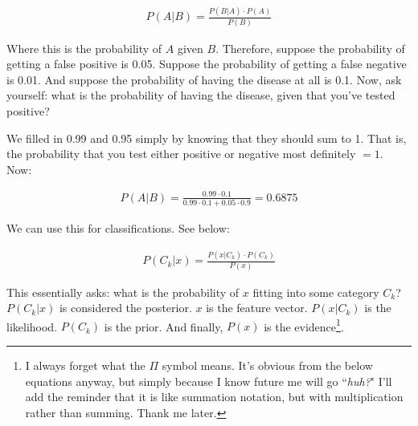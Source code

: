 \begin{equation}
\begin{split}
    P(A | B) = \frac{P(B | A) \cdot P(A)}{P(B)}
\end{split}
\end{equation}

Where this is the probability of $A$ given $B$. Therefore, suppose the probability of getting a false positive is 0.05. Suppose the probability of getting a false negative is 0.01. And suppose the probability of having the disease at all is 0.1. Now, ask yourself: what is the probability of having the disease, given that you've tested positive?\newline


We filled in 0.99 and 0.95 simply by knowing that they should sum to 1. That is, the probability that you test either positive or negative most definitely $=1$.  Now: 

\begin{equation}
\begin{split}
    P(A | B) = \frac{0.99 \cdot 0.1}{0.99 \cdot 0.1 + 0.05\cdot 0.9} = 0.6875
\end{split}
\end{equation}

We can use this for classifications. See below: 

\begin{equation}
\begin{split}
    P(C_k | x) = \frac{P(x | C_k) \cdot P(C_k)}{P(x)}
\end{split}
\end{equation}

This essentially asks: what is the probability of $x$ fitting into some category $C_k$? $P(C_k | x)$ is considered the posterior. $x$ is the feature vector. $P(x | C_k)$ is the likelihood. $P(C_k)$ is the prior. And finally, $P(x)$ is the evidence\footnote{I always forget what the $\Pi$ symbol means. It's obvious from the below equations anyway, but simply because I know future me will go ``\textit{huh?}" I'll add the reminder that it is like summation notation, but with multiplication rather than summing. Thank me later.}. 

